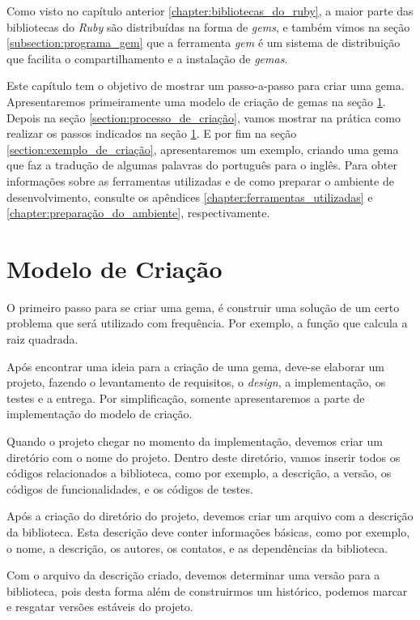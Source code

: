 Como visto no capítulo anterior \ref{chapter:bibliotecas_do_ruby}, a maior parte das bibliotecas do
\emph{Ruby} são distribuídas na forma de \emph{gems}, e também vimos na seção
\ref{subsection:programa_gem} que a ferramenta \emph{gem} é um sistema de distribuição
que facilita o compartilhamento e a instalação de \emph{gemas}.

Este capítulo tem o objetivo de mostrar um passo-a-passo para criar uma gema.
Apresentaremos primeiramente uma modelo de criação de gemas na seção \ref{section:modelo_de_criação}.
Depois na seção \ref{section:processo_de_criação}, vamos mostrar na prática como realizar os passos indicados
na seção \ref{section:modelo_de_criação}. E por fim na seção \ref{section:exemplo_de_criação}, apresentaremos um
exemplo, criando uma gema que faz a tradução de algumas palavras do português para o inglês. Para obter informações
sobre as ferramentas utilizadas e de como preparar o ambiente de desenvolvimento, consulte os apêndices
\ref{chapter:ferramentas_utilizadas} e \ref{chapter:preparação_do_ambiente}, respectivamente.


\section{Modelo de Criação}
\label{section:modelo_de_criação}


O primeiro passo para se criar uma gema, é construir uma solução de um certo problema que será utilizado
com frequência. Por exemplo, a função que calcula a raiz quadrada.

Após encontrar uma ideia para a criação de uma gema, deve-se elaborar um projeto, fazendo o levantamento
de requisitos, o \emph{design}, a implementação, os testes e a entrega. Por simplificação, somente
apresentaremos a parte de implementação do modelo de criação.

Quando o projeto chegar no momento da implementação, devemos criar um diretório com o nome do projeto.
Dentro deste diretório, vamos inserir todos os códigos relacionados a biblioteca, como por exemplo, a
descrição, a versão, os códigos de funcionalidades, e os códigos de testes.

Após a criação do diretório do projeto, devemos criar um arquivo com a descrição da biblioteca. Esta
descrição deve conter informações básicas, como por exemplo, o nome, a descrição, os autores, os
contatos, e as dependências da biblioteca.

Com o arquivo da descrição criado, devemos determinar uma versão para a biblioteca, pois desta forma
além de construirmos um histórico, podemos marcar e resgatar versões estáveis do projeto.

